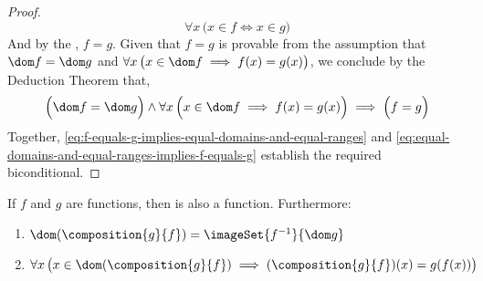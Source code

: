 \begin{proof}
    \begin{equation*}
        \forall x \, \big( x \in f \iff x \in g \big)
    \end{equation*}
    And by the , \( f = g \). Given that \( f = g \) is provable from the assumption that
    \( \dom f = \dom g \) and \( \forall x \, \big( x \in \dom f \implies f(x) = g(x) \big) \), we conclude by the Deduction
    Theorem that,
    \begin{equation}
        \label{eq:equal-domains-and-equal-ranges-implies-f-equals-g}
        \Big( \dom f = \dom g \Big) \land \forall x \, \Big( x \in \dom f \implies f(x) = g(x) \Big) \implies \Big( f = g \Big)
    \end{equation}
    Together, \eqref{eq:f-equals-g-implies-equal-domains-and-equal-ranges} and \eqref{eq:equal-domains-and-equal-ranges-implies-f-equals-g}
    establish the required biconditional.
\end{proof}

\begin{thm}
    \label{thm:the-composition-of-any-two-functions-is-also-a-function}
    If \( f \) and \( g \) are functions, then  is also a function. Furthermore:
    \begin{enumerate}[topsep=2pt,noitemsep,label=(\roman*)]
        \item \( \dom \mleft( \composition{g}{f} \mright) = \imageSet{f^{-1}}{\dom g} \) \label{enum:composite-function-claim-1}
        \item \( \forall x \, \big( x \in \dom \mleft( \composition{g}{f} \mright) \implies \mleft( \composition{g}{f} \mright)(x) = g(f(x)) \big) \)
        \label{enum:composite-function-claim-2}
    \end{enumerate}
\end{thm}

